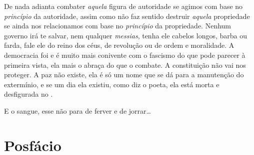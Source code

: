 De nada adianta combater \emph{aquela} figura de autoridade se agimos
com base no \emph{princípio} da autoridade, assim como não faz sentido
destruir \emph{aquela} propriedade se ainda nos relacionamos com base no
\emph{princípio} da propriedade. Nenhum governo irá te salvar, nem
qualquer \emph{messias}, tenha ele cabelos longos, barba ou farda, fale
ele do reino dos céus, de revolução ou de ordem e moralidade. A
democracia foi e é muito mais conivente com o fascismo do que pode
parecer à primeira vista, ela mais o abraça do que o combate. A
constituição não vai nos proteger. A paz não existe, ela é só um nome
que se dá para a manutenção do extermínio, e se um dia ela existiu, como
diz o poeta, ela está morta e desfigurada no .

E o sangue, esse não para de ferver e de jorrar\ldots{}


\chapter[Posfácio]{Posfácio }

\lipsum[5]
\lipsum[5]
\lipsum[5]
\lipsum[5]
\lipsum[5]